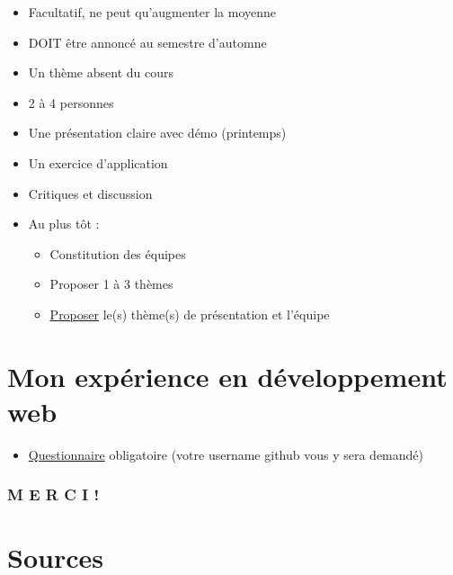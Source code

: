 \begin{itemize}
\tightlist
\item
  Facultatif, ne peut qu'augmenter la moyenne
\item
  DOIT être annoncé au semestre d'automne
\item
  Un thème absent du cours
\item
  2 à 4 personnes
\item
  Une présentation claire avec démo (printemps)
\item
  Un exercice d'application
\item
  Critiques et discussion
\item
  Au plus tôt :

  \begin{itemize}
  \tightlist
  \item
    Constitution des équipes
  \item
    Proposer 1 à 3 thèmes
  \item
    \href{https://docs.google.com/spreadsheet/viewform?formkey=dEVJRE1WVTVPelhFcE94TGF5N1c0cGc6MQ}{Proposer}
    le(s) thème(s) de présentation et l'équipe
  \end{itemize}
\end{itemize}

\hypertarget{mon-expuxe9rience-en-duxe9veloppement-web}{%
\section{Mon expérience en développement
web}\label{mon-expuxe9rience-en-duxe9veloppement-web}}

\begin{itemize}
\tightlist
\item
  \href{https://docs.google.com/spreadsheet/viewform?formkey=dDg5Znh5akRBV1hPbC1qYlVRV3BONFE6MQ}{Questionnaire}
  obligatoire (votre username github vous y sera demandé)
\end{itemize}

\hypertarget{m-e-r-c-i}{%
\subsubsection{M E R C I !}\label{m-e-r-c-i}}

\begin{otherlanguage}{english}

\end{otherlanguage}

\begin{otherlanguage}{english}

\end{otherlanguage}

\begin{otherlanguage}{english}

\end{otherlanguage}

\hypertarget{sources}{%
\section{Sources}\label{sources}}
